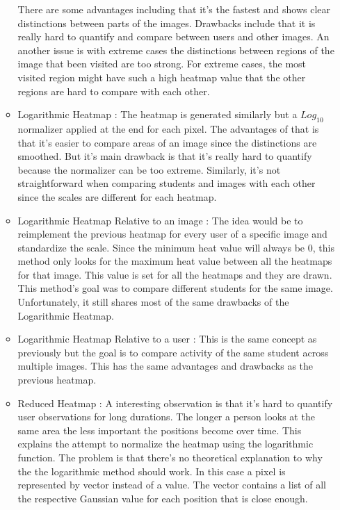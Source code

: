 \documentclass[a4paper,11pt]{report}
\numberwithin{figure}{section} %
\begin{document}
\begin{itemize}
\begin{itemize}
            There are some advantages including that it's the fastest and shows clear distinctions between parts of the images.
            Drawbacks include that it is really hard to quantify and compare between users and other images.
            An another issue is with extreme cases the distinctions between regions of the image that been visited are too strong.
            For extreme cases, the most visited region might have such a high heatmap value that the other regions are hard to compare with each other.
            \item Logarithmic Heatmap : The heatmap is generated similarly but a $Log_{10}$ normalizer applied at the end for each pixel.
            The advantages of that is that it's easier to compare areas of an image since the distinctions are smoothed.
            But it's main drawback is that it's really hard to quantify because the normalizer can be too extreme.
            Similarly, it's not straightforward when comparing students and images with each other since the scales are different for each heatmap.
            \item Logarithmic Heatmap Relative to an image : The idea would be to reimplement the previous heatmap for every user of a specific image and standardize the scale.
            Since the minimum heat value will always be 0, this method only looks for the maximum heat value between all the heatmaps for that image.
            This value is set for all the heatmaps and they are drawn. This method's goal was to compare different students for the same image.
            Unfortunately, it still shares most of the same drawbacks of the Logarithmic Heatmap.
            \item Logarithmic Heatmap Relative to a user : This is the same concept as previously but the goal is to compare activity of the same student across multiple images.
            This has the same advantages and drawbacks as the previous heatmap.
            \item Reduced Heatmap : A interesting observation is that it's hard to quantify user observations for long durations.
            The longer a person looks at the same area the less important the positions become over time.
            This explains the attempt to normalize the heatmap using the logarithmic function.
            The problem is that there's no theoretical explanation to why the the logarithmic method should work.
            In this case a pixel is represented by vector instead of a value.
            The vector contains a list of all the respective Gaussian value for each position that is close enough.

\end{itemize}
\end{itemize}
\end{document}
